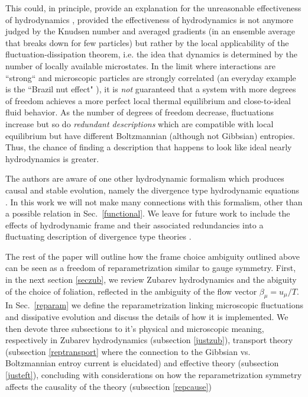 \documentclass[12pt,onecolumn,showpacs,amssymb,aps,nofootinbib,floatfix]{revtex4-2}
\begin{document}
\color{black}
This could, in principle, provide an explanation for the unreasonable effectiveness of hydrodynamics \cite{zajc}, provided the effectiveness of hydrodynamics is not anymore judged by the Knudsen number and averaged gradients (in an ensemble average that breaks down for few particles) but rather by the local applicability of the fluctuation-dissipation theorem, i.e. the idea that dynamics is determined by the number of locally available microstates.      In the limit where interactions are ``strong`` and microscopic particles are strongly correlated (an everyday example is the ``Brazil nut effect" \cite{brazilnut}), it is {\em not} guaranteed that a system with more degrees of freedom achieves a more perfect local thermal equilibrium and close-to-ideal fluid behavior.    As the number of degrees of freedom decrease, fluctuations increase but so do {\em redundant descriptions} which are compatible with local equilibrium but have different Boltzmannian (although not Gibbsian) entropies.    Thus, the chance of finding a description that happens to look like ideal nearly hydrodynamics is greater.\color{black}

\color{black}
The authors are aware of one other hydrodynamic formalism which produces causal and stable evolution, namely the divergence type hydrodynamic equations \cite{LIU1986191,geroch,Aguilar:2017ios}. In this work we will not make many connections with this formalism, other than a possible relation in Sec.\ \ref{functional}. We leave for future work to include the effects of hydrodynamic frame and their associated redundancies into a fluctuating description of divergence type theories \cite{Miron-Granese:2020mbf, Calzetta:1997aj}. 


        \color{black}
        The rest of the paper will outline how the frame choice ambiguity outlined above can be seen as a freedom of reparametrization similar to gauge symmetry.  First, in the next section \ref{seczub}, we review Zubarev hydrodynamics and the abiguity of the choice of foliation, reflected in the ambiguity of the flow vector $\beta_\mu=u_\mu/T$. In Sec.\ \ref{reparam} we define the reparametrization linking microscopic fluctuations and dissipative evolution and discuss the details of how it is implemented.   We then devote three subsections to it's physical and microscopic  meaning, respectively in Zubarev hydrodynamics (subsection \ref{justzub}), transport theory (subsection \ref{reptransport} where the connection to the Gibbsian vs. Boltzmannian entroy current is elucidated) and effective theory (subsection \ref{justeft}), concluding with considerations on how the reparametrization symmetry affects the causality of the theory (subsection \ref{repcause})
\end{document}
